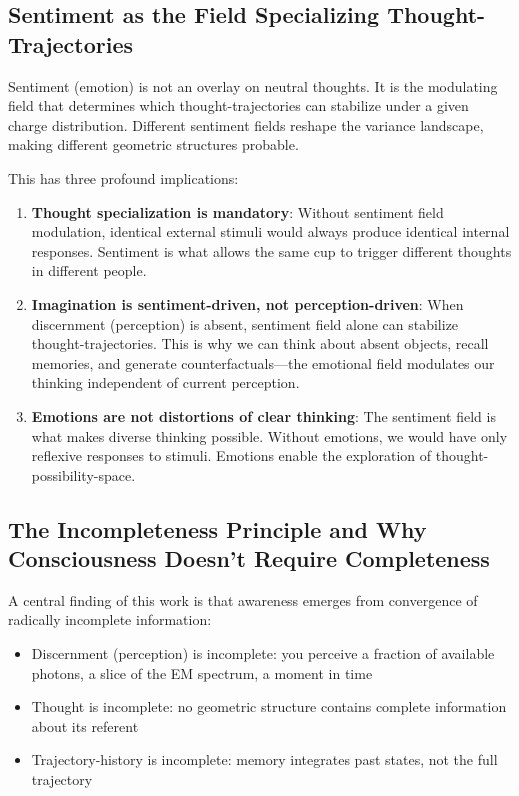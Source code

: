 \documentclass[twocolumn,11pt,a4paper]{article}
\begin{document}
\subsection{Sentiment as the Field Specializing Thought-Trajectories}

Sentiment (emotion) is not an overlay on neutral thoughts. It is the modulating field that determines which thought-trajectories can stabilize under a given charge distribution. Different sentiment fields reshape the variance landscape, making different geometric structures probable.

This has three profound implications:

\begin{enumerate}[label=(\arabic*),leftmargin=*]
\item \textbf{Thought specialization is mandatory}: Without sentiment field modulation, identical external stimuli would always produce identical internal responses. Sentiment is what allows the same cup to trigger different thoughts in different people.

\item \textbf{Imagination is sentiment-driven, not perception-driven}: When discernment (perception) is absent, sentiment field alone can stabilize thought-trajectories. This is why we can think about absent objects, recall memories, and generate counterfactuals—the emotional field modulates our thinking independent of current perception.

\item \textbf{Emotions are not distortions of clear thinking}: The sentiment field is what makes diverse thinking possible. Without emotions, we would have only reflexive responses to stimuli. Emotions enable the exploration of thought-possibility-space.

\end{enumerate}

\subsection{The Incompleteness Principle and Why Consciousness Doesn't Require Completeness}

A central finding of this work is that awareness emerges from convergence of radically incomplete information:

\begin{itemize}
\item Discernment (perception) is incomplete: you perceive a fraction of available photons, a slice of the EM spectrum, a moment in time
\item Thought is incomplete: no geometric structure contains complete information about its referent
\item Trajectory-history is incomplete: memory integrates past states, not the full trajectory
\end{itemize}
\end{document}
